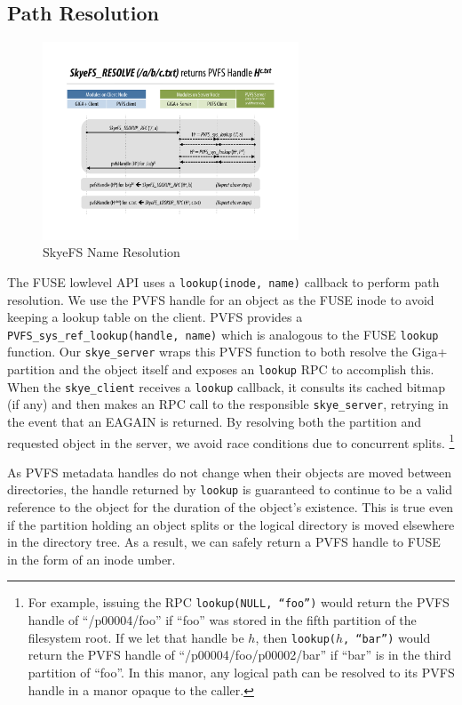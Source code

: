 \documentclass[twocolumn,letterpaper]{article}
\newcommand{\code}[1]{\texttt{#1}}
\begin{document}
\subsection{Path Resolution}
\begin{figure}
\begin{center}
\includegraphics[width=3in]{figure-resolve}
\end{center}
\caption{SkyeFS Name Resolution}
\end{figure}
The FUSE lowlevel API uses a \code{lookup(inode, name)} callback to perform
path resolution.  We use the PVFS handle for an object as the FUSE inode to
avoid keeping a lookup table on the client.  PVFS provides a
\code{PVFS\_\-sys\_\-ref\_\-lookup(handle, name)} which is analogous to the
FUSE \code{lookup} function.  Our \code{skye\_server} wraps this PVFS function
to both resolve the Giga+ partition and the object itself and exposes an
\code{lookup} RPC to accomplish this.  When the \code{skye\_client} receives a
\code{lookup} callback, it consults its cached bitmap (if any) and then
makes an RPC call to the responsible \code{skye\_server}, retrying in the
event that an EAGAIN is returned.  By resolving both the partition and
requested object in the server, we avoid race conditions due to concurrent
splits.  \footnote{For example, issuing the RPC \code{lookup(NULL, ``foo'')}
would return the PVFS handle of ``/p00004/foo'' if ``foo'' was stored in the
fifth partition of the filesystem root.  If we let that handle be $h$, then
\code{lookup($h$, ``bar'')} would return the PVFS handle of
``/p00004/foo/p00002/bar'' if ``bar'' is in the third partition of ``foo''.
In this manor, any logical path can be resolved to its PVFS handle in a manor
opaque to the caller.}

As PVFS metadata handles do not change when their objects are moved between
directories, the handle returned by \code{lookup} is guaranteed to continue to
be a valid reference to the object for the duration of the object's existence.
This is true even if the partition holding an object splits or the logical
directory is moved elsewhere in the directory tree.  As a result, we can
safely return a PVFS handle to FUSE in the form of an inode umber.
\end{document}
